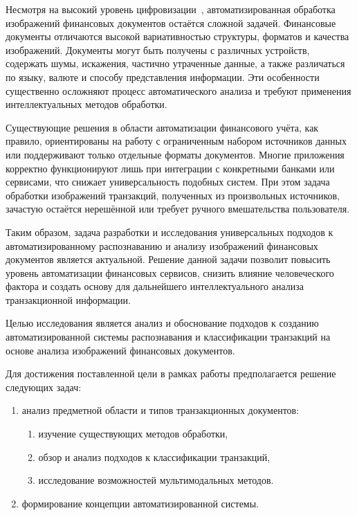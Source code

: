 \documentclass[14pt,a4paper]{extarticle}
\begin{document}
Несмотря на высокий уровень цифровизации~\cite{yakovleva2023}, автоматизированная обработка изображений финансовых документов остаётся сложной задачей. Финансовые документы отличаются высокой вариативностью структуры, форматов и качества изображений. Документы могут быть получены с различных устройств, содержать шумы, искажения, частично утраченные данные, а также различаться по языку, валюте и способу представления информации. Эти особенности существенно осложняют процесс автоматического анализа и требуют применения интеллектуальных методов обработки.

Существующие решения в области автоматизации финансового учёта, как правило, ориентированы на работу с ограниченным набором источников данных или поддерживают только отдельные форматы документов. Многие приложения корректно функционируют лишь при интеграции с конкретными банками или сервисами, что снижает универсальность подобных систем. При этом задача обработки изображений транзакций, полученных из произвольных источников, зачастую остаётся нерешённой или требует ручного вмешательства пользователя.

Таким образом, задача разработки и исследования универсальных подходов к автоматизированному распознаванию и анализу изображений финансовых документов является актуальной. Решение данной задачи позволит повысить уровень автоматизации финансовых сервисов, снизить влияние человеческого фактора и создать основу для дальнейшего интеллектуального анализа транзакционной информации.


Целью исследования является анализ и обоснование подходов к созданию автоматизированной системы распознавания и классификации транзакций на основе анализа изображений финансовых документов.

Для достижения поставленной цели в рамках работы предполагается решение следующих задач:

\begin{enumerate} 
  
\item анализ предметной области и типов транзакционных документов:

\begin{enumerate}

\item изучение существующих методов обработки,

\item обзор и анализ подходов к классификации транзакций,

\item исследование возможностей мультимодальных методов.

\end{enumerate}

\item формирование концепции автоматизированной системы.

\end{enumerate}
\end{document}

